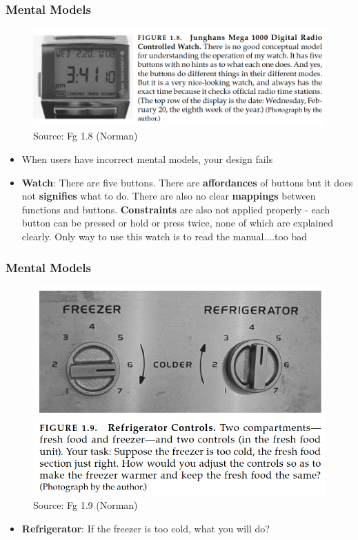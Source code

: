 \documentclass{beamer}
\begin{document}
\begin{frame}
\frametitle{Mental Models}
\centering
\begin{figure}
	\includegraphics[width=0.6\linewidth]{model}
	\caption{Source: Fg 1.8 (Norman)}
\end{figure}
\vspace{-10pt}
\begin{itemize}
	\item When users have incorrect mental models, your design fails
	\item \textbf{Watch}: There are five buttons.  There are \textbf{affordances} of buttons but it does not \textbf{signifies} what to do.  There are also no clear \textbf{mappings} between functions and buttons.   \textbf{Constraints} are also not applied properly - each button can be pressed or hold or press twice, none of which are explained clearly.   Only way to use this watch is to read the manual....too bad
\end{itemize}
\end{frame}


\begin{frame}
\frametitle{Mental Models}
\centering
\begin{figure}
	\includegraphics[width=0.6\linewidth]{model2}
	\caption{Source: Fg 1.9 (Norman)}
\end{figure}
\vspace{-10pt}
\begin{itemize}
	\item \textbf{Refrigerator}: If the freezer is too cold, what you will do?
\end{itemize}
\end{frame}
\end{document}
